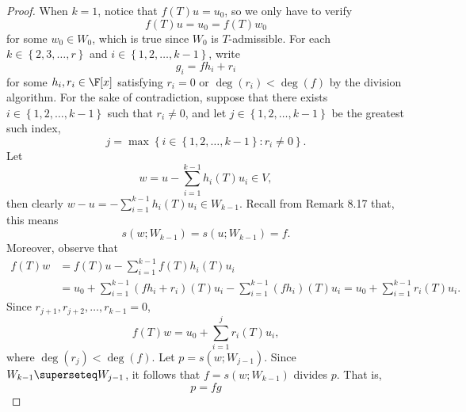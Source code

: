 \documentclass[linearalgebra]{subfiles}
\begin{document}
    \begin{proof}
        When $k=1$, notice that $f(T)u=u_0$, so we only have to verify
        \begin{equation*}
            f(T)u = u_0 = f(T)w_0
        \end{equation*}
        for some $w_0\in W_0$, which is true since $W_0$ is $T$-admissible. For each $k\in \left\lbrace 2,3,\ldots,r \right\rbrace$ and $i\in\left\lbrace 1,2,\ldots,k-1 \right\rbrace$, write
        \begin{equation*}
            g_i = fh_i+r_i
        \end{equation*}
        for some $h_i,r_i\in\F[x]$ satisfying $r_i=0$ or $\deg(r_i)<\deg(f)$ by the division algorithm. For the sake of contradiction, suppose that there exists $i\in \left\lbrace 1,2,\ldots,k-1 \right\rbrace$ such that $r_i\neq 0$, and let $j\in\left\lbrace 1,2,\ldots,k-1 \right\rbrace$ be the greatest such index,
        \begin{equation*}
            j = \max\left\lbrace i\in\left\lbrace 1,2,\ldots,k-1 \right\rbrace :r_i\neq 0 \right\rbrace .
        \end{equation*}
        Let
        \begin{equation*}
            w = u - \sum^{k-1}_{i=1} h_i(T)u_i\in V,
        \end{equation*}
        then clearly $w-u = -\sum^{k-1}_{i=1} h_i(T)u_i\in W_{k-1}$. Recall from Remark 8.17 that, this means
        \begin{equation*}
            s(w;W_{k-1}) = s(u;W_{k-1}) = f.
        \end{equation*}
        Moreover, observe that
        \begin{align*}
            f(T)w & = f(T)u - \sum^{k-1}_{i=1} f(T)h_i(T)u_i \\
                  & = u_0 + \sum^{k-1}_{i=1} \left( fh_i+r_i \right) (T)u_i - \sum^{k-1}_{i=1} \left( fh_i \right) (T)u_i = u_0 + \sum^{k-1}_{i=1} r_i(T)u_i.
        \end{align*} 
        Since $r_{j+1}, r_{j+2}, \ldots, r_{k-1}=0$,
        \begin{equation*}
            f(T)w = u_0 + \sum^{j}_{i=1} r_i(T)u_i,
        \end{equation*}
        where $\deg\left(r_j\right)<\deg(f)$. Let $p=s\left( w;W_{j-1} \right) $. Since $W_{k-1}\superseteq W_{j-1}$, it follows that $f = s\left( w;W_{k-1} \right) $ divides $p$. That is,
        \begin{equation*}
            p = fg

\end{equation*}
\end{proof}
\end{document}
